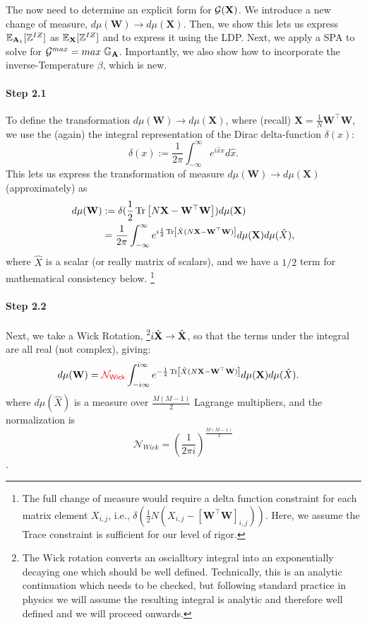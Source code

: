 The now need to  determine an explicit form for
$\mathcal{G}(\mathbf{X})$. We introduce a new change of measure, 
 $d\mu(\mathbf{W})\rightarrow d\mu(\mathbf{X})$.
Then, we show this lets us express $\mathbb{E}_{\mathbf{A}_1}[\mathbb{Z}^{IZ}]$ as $\mathbb{E}_{\mathbf{X}}[\mathbb{Z}^{IZ}]$ and to express it using the LDP.
Next, we apply a SPA to solve for $\mathcal{G}^{max}=max\;\mathbb{G}_{\mathbf{A}}$.
Importantly, we also show how to incorporate the inverse-Temperature $\beta$,
which is new.

\paragraph{Step 2.1}
To define the transformation $d\mu(\mathbf{W})\rightarrow d\mu(\mathbf{X})$,  where (recall) $\mathbf{X}=\frac{1}{N}\mathbf{W}^{\top}\mathbf{W}$,
we use the (again) the integral representation of the Dirac delta-function $\delta(x)$:
\begin{equation}
  \label{eqn:dirac}
  \delta(x):=\frac{1}{2\pi}\int_{-\infty}^{\infty} e^{i\hat{x}x} d\hat{x}.
\end{equation}
%
This lets us express the transformation of measure $d\mu(\mathbf{W})\rightarrow d\mu(\mathbf{X})$
(approximately) as
\begin{align}
\nonumber
  d\mu(\mathbf{W}) &:= \delta(\frac{1}{2}\mbox{}\operatorname{Tr}\left[N\mathbf{X}-\mathbf{W}^{\top}\mathbf{W}\right]) d\mu(\mathbf{X}) \\ 
  &= \frac{1}{2\pi}\int_{-\infty}^{\infty} e^{i\frac{1}{2}
    \mbox{}\operatorname{Tr}\left[\hat{X}(N\mathbf{X}-\mathbf{W}^{\top}\mathbf{W})\right]
  }
  d\mu(\mathbf{X})d\mu(\hat{X} ),
\end{align}
where $\hat{X}$ is a scalar (or really matrix of scalars),
and we have a $1/2$ term for mathematical consistency below.
\footnote{The full change of measure would require a delta function constraint
for each matrix element $X_{i,j}$, i.e., 
$\delta\left(\frac{1}{2}N\left(X_{i,j}-[\mathbf{W}^{\top}\mathbf{W}]_{i,j}\right)\right)$.
Here, we assume the Trace constraint is sufficient for our level of rigor.
}



\paragraph{Step 2.2}
Next, we take a Wick Rotation, 
\footnote{The Wick rotation converts an oscialltory integral into an exponentially decaying one which should be well defined.  Technically, this is an analytic continuation which needs to be checked, but following standard practice in physics we will assume the resulting integral is analytic and therefore well defined and we will proceed onwards. }$i\hat{\mathbf{X}}\rightarrow \hat{\mathbf{X}}$, so that the terms under the integral are all real (not complex), giving:
\begin{align}
  \label{eqn:dmuX}
  d\mu(\mathbf{W}) &= {\color{red}\sf{\mathcal{N}_{Wick}}}\int_{-i\infty}^{i\infty} e^{{\color{red}\sf{-}}\frac{1}{2}\mbox{}\operatorname{Tr}\left[\hat{X}(N\mathbf{X}-\mathbf{W}^{\top}\mathbf{W})\right]} d\mu(\mathbf{X})d\mu(\hat{X} ).
\end{align}
where $d\mu(\hat{X})$ is a measure over $\tfrac{M(M-1)}{2}$ Lagrange multipliers, and the normalization is  $$\mathcal{N}_{Wick}=(\frac{1}{2\pi i})^{\tfrac{M(M-1)}{2}}$$.


